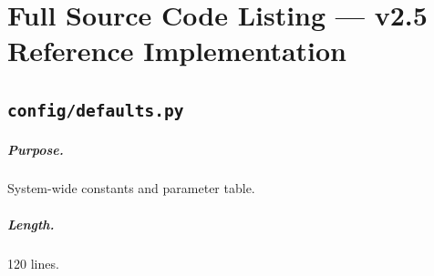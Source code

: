 \chapter{Full Source Code Listing --- v2.5 Reference Implementation}
\label{app:code}



\section{\texttt{config/defaults.py}}
\label{app:code:config-defaults-py}

\paragraph{Purpose.} System-wide constants and parameter table.

\paragraph{Length.} 120 lines.

